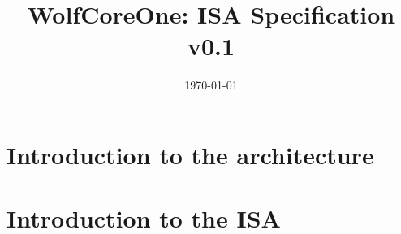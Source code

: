 \documentclass[a4paper,11pt]{article}
\begin{document}
\title{WolfCoreOne: ISA Specification v0.1}
\date{\today}
\maketitle
\section{Introduction to the architecture}

\section{Introduction to the ISA}
\end{document}
